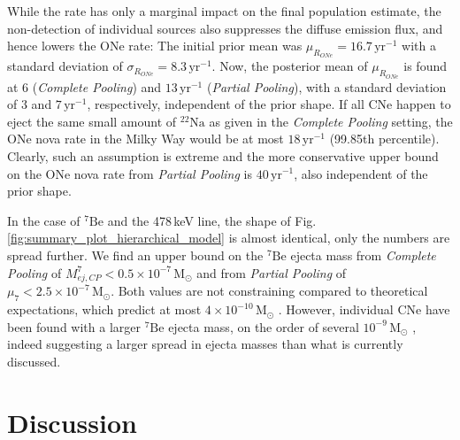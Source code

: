 \documentclass{aa}
\newcommand{\mrm}[1]{\mathrm{#1}}
\newcommand{\nuc}[2]{$\mrm{^{#2}#1}$}
\begin{document}
While the rate has only a marginal impact on the final population estimate, the non-detection of individual sources also suppresses the diffuse emission flux, and hence lowers the ONe rate:
%
The initial prior mean was $\mu_{R_{ONe}} = 16.7\,\mrm{yr^{-1}}$ with a standard deviation of $\sigma_{R_{ONe}} = 8.3\,\mrm{yr^{-1}}$.
%
Now, the posterior mean of  $\mu_{R_{ONe}}$ is found at $6$ (\textit{Complete Pooling}) and $13\,\mrm{yr^{-1}}$ (\textit{Partial Pooling}), with a standard deviation of $3$ and $7\,\mrm{yr^{-1}}$, respectively, independent of the prior shape.
%
If all CNe happen to eject the same small amount of \nuc{Na}{22} as given in the \textit{Complete Pooling} setting, the ONe nova rate in the Milky Way would be at most $18\,\mrm{yr^{-1}}$ (99.85th percentile).
%
Clearly, such an assumption is extreme and the more conservative upper bound on the ONe nova rate from \textit{Partial Pooling} is $40\,\mrm{yr^{-1}}$, also independent of the prior shape.

In the case of \nuc{Be}{7} and the 478\,keV line, the shape of Fig.\,\ref{fig:summary_plot_hierarchical_model} is almost identical, only the numbers are spread further.
%
We find an upper bound on the \nuc{Be}{7} ejecta mass from \textit{Complete Pooling} of $M_{ej,CP}^{7} <0.5 \times 10^{-7}\,\mrm{M_{\odot}}$ and from \textit{Partial Pooling} of $\mu_7 < 2.5 \times 10^{-7}\,\mrm{M_{\odot}}$.
%
Both values are not constraining compared to theoretical expectations, which predict at most $4 \times 10^{-10}\,\mrm{M_{\odot}}$ \citep[e.g.][]{abcdefgh}.
%
However, individual CNe have been found with a larger \nuc{Be}{7} ejecta mass, on the order of several $10^{-9}\,\mrm{M_{\odot}}$ \citep[e.g.,][]{Molaro2016_V5668,Tajitsu2016_V5668,Tajitsu2015_novaBe7}, indeed suggesting a larger spread in ejecta masses than what is currently discussed.



\section{Discussion}\label{sec:discussion}
\end{document}
